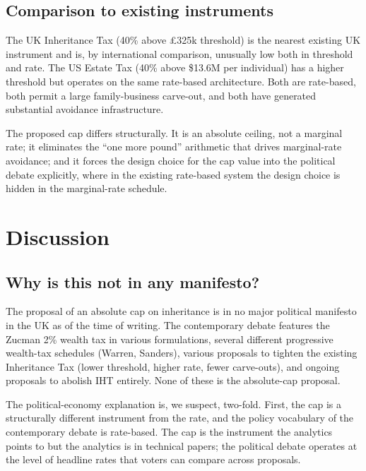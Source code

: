 \documentclass[11pt]{article}
\begin{document}
\subsection{Comparison to existing instruments}

The UK Inheritance Tax (40\% above \pounds 325k threshold) is the
nearest existing UK instrument and is, by international comparison,
unusually low both in threshold and rate.  The US Estate Tax (40\%
above \$13.6M per individual) has a higher threshold but operates
on the same rate-based architecture.  Both are rate-based, both
permit a large family-business carve-out, and both have generated
substantial avoidance infrastructure.

The proposed cap differs structurally.  It is an absolute ceiling,
not a marginal rate; it eliminates the ``one more pound'' arithmetic
that drives marginal-rate avoidance; and it forces the design
choice for the cap value into the political debate explicitly,
where in the existing rate-based system the design choice is
hidden in the marginal-rate schedule.

\section{Discussion}
\label{sec:discussion}

\subsection{Why is this not in any manifesto?}

The proposal of an absolute cap on inheritance is in no major
political manifesto in the UK as of the time of writing.  The
contemporary debate features the Zucman 2\% wealth tax in various
formulations, several different progressive wealth-tax schedules
(Warren, Sanders), various proposals to tighten the existing
Inheritance Tax (lower threshold, higher rate, fewer carve-outs),
and ongoing proposals to abolish IHT entirely.  None of these is
the absolute-cap proposal.

The political-economy explanation is, we suspect, two-fold.  First,
the cap is a structurally different instrument from the rate, and
the policy vocabulary of the contemporary debate is rate-based.
The cap is the instrument the analytics points to but the analytics
is in technical papers; the political debate operates at the level
of headline rates that voters can compare across proposals.
\end{document}
